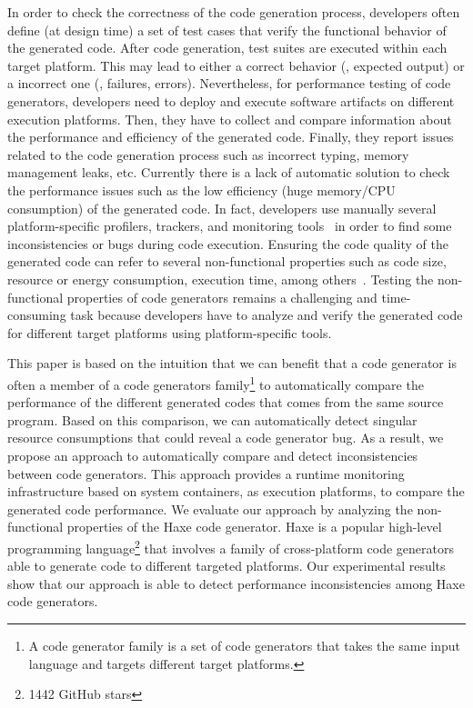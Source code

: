 In order to check the correctness of the code generation process, developers often define (at design time) a set of test cases that verify the functional behavior of the generated code. After code generation, test suites are executed within each target platform. This may lead to either a correct behavior (\ie, expected output) or a incorrect one (\ie, failures, errors).
Nevertheless, for performance testing of code generators, developers need to deploy and execute software artifacts on different execution platforms. Then, they have to collect and compare information about the performance and efficiency of the generated code. Finally, they report issues related to the code generation process such as incorrect typing, memory management leaks, etc. Currently there is a lack of automatic solution to check the performance issues such as the low efficiency (huge memory/CPU consumption) of the generated code. In fact, developers use manually several platform-specific profilers, trackers, and monitoring tools~\cite{guana2014chaintracker,delgado2004taxonomy} in order to find some inconsistencies or bugs during code execution. Ensuring the code quality of the generated code can refer to several non-functional properties such as code size, resource or energy consumption, execution time, among others~\cite{pan2006fast}. %
Testing the non-functional properties of code generators remains a challenging and time-consuming task because developers have to analyze and verify the generated code for different target platforms using platform-specific tools.

This paper is based on the intuition that we can benefit that a code generator is often a member of a code generators family\footnote{A code generator family is a set of code generators that takes the same input language and targets different target platforms.} to automatically compare the  performance of the different generated codes that comes from the same source program. Based on this comparison, we can automatically detect singular resource consumptions that could reveal a code generator bug. As a result, we propose an approach to automatically compare and detect inconsistencies between code generators. This approach provides a runtime monitoring infrastructure based on system containers, as execution platforms, to compare the generated code performance. %
We evaluate our approach by analyzing the non-functional properties of the Haxe code generator. Haxe is a popular high-level programming language\footnote{\num{1442} GitHub stars} that involves a family of cross-platform code generators able to generate code to different targeted platforms. Our experimental results show that our approach is able to detect performance inconsistencies among Haxe code generators.

